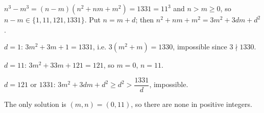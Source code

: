 $n^3-m^3=(n-m)(n^2+nm+m^2)=1331=11^3$ and $n>m\ge0$, so $n-m\in\{1,11,121,1331\}$. Put $n=m+d$; then $n^2+nm+m^2=3m^2+3dm+d^2$.

$d=1$: $3m^2+3m+1=1331$, i.e. $3(m^2+m)=1330$, impossible since $3\nmid1330$.

$d=11$: $3m^2+33m+121=121$, so $m=0$, $n=11$.

$d=121$ or $1331$: $3m^2+3dm+d^2\ge d^2>\dfrac{1331}d$, impossible.

The only solution is $\boxed{(m,n)=(0,11)}$, so there are none in positive integers.
